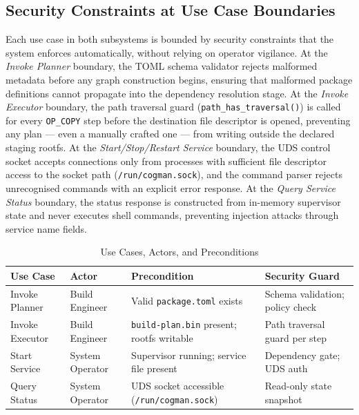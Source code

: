 \documentclass[12pt,a4paper]{report}
\begin{document}
\subsection{Security Constraints at Use Case Boundaries}

Each use case in both subsystems is bounded by security constraints that the
system enforces automatically, without relying on operator vigilance. At the
\textit{Invoke Planner} boundary, the TOML schema validator rejects malformed
metadata before any graph construction begins, ensuring that malformed package
definitions cannot propagate into the dependency resolution stage. At the
\textit{Invoke Executor} boundary, the path traversal guard
(\texttt{path\_has\_traversal()}) is called for every \texttt{OP\_COPY} step
before the destination file descriptor is opened, preventing any plan --- even a
manually crafted one --- from writing outside the declared staging rootfs. At the
\textit{Start/Stop/Restart Service} boundary, the UDS control socket accepts
connections only from processes with sufficient file descriptor access to the
socket path (\texttt{/run/cogman.sock}), and the command parser rejects
unrecognised commands with an explicit error response. At the \textit{Query
Service Status} boundary, the status response is constructed from in-memory
supervisor state and never executes shell commands, preventing injection attacks
through service name fields.

\begin{table}[H]
\centering
\caption{Use Cases, Actors, and Preconditions}
\label{tab:usecases}
\renewcommand{\arraystretch}{1.2}
\begin{tabularx}{\linewidth}{l l X X}
\toprule
\textbf{Use Case} & \textbf{Actor} & \textbf{Precondition} & \textbf{Security Guard}\\
\midrule
Invoke Planner   & Build Engineer    & Valid \texttt{package.toml} exists    & Schema validation; policy check\\
Invoke Executor  & Build Engineer    & \texttt{build-plan.bin} present; rootfs writable & Path traversal guard per step\\
Start Service    & System Operator   & Supervisor running; service file present & Dependency gate; UDS auth\\
Query Status     & System Operator   & UDS socket accessible (\texttt{/run/cogman.sock}) & Read-only state snapshot\\
\bottomrule
\end{tabularx}
\end{table}
\end{document}
